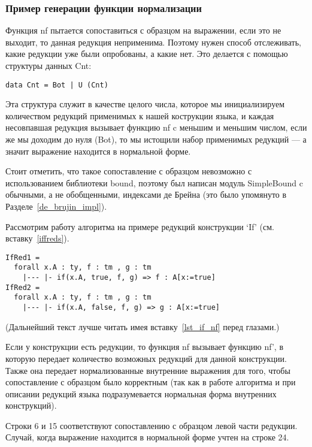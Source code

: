 \pagebreak
\subsubsection{Пример генерации функции нормализации}

Функция nf пытается сопоставиться с образцом на выражении, если это не выходит, то данная редукция неприменима. Поэтому нужен способ отслеживать, какие редукции уже были опробованы, а какие нет. Это делается с помощью структуры данных Cnt:

\begin{lstlisting}
data Cnt = Bot | U (Cnt)
\end{lstlisting}

Эта структура служит в качестве целого числа, которое мы инициализируем количеством редукций применимых к нашей кострукции языка, и каждая несовпавшая редукция вызывает функцию nf c меньшим и меньшим числом, если же мы доходим до нуля (Bot), то мы истощили набор применимых редукций --- а значит выражение находится в нормальной форме.

Стоит отметить, что такое сопоставление с образцом невозможно с использованием библиотеки bound\cite{bound}, поэтому был написан модуль SimpleBound c обычными, а не обобщенными, индексами де Брейна (это было упомянуто в Разделе~\ref{de_brujin_impl}).

Рассмотрим работу алгоритма на примере редукций конструкции `If' (см. вставку~\ref{iffreds}).

\begin{lstlisting}[label={iffreds}, caption={Правила редукций для конструкции If},captionpos=b, frame=single, float, floatplacement=H]
IfRed1 =
  forall x.A : ty, f : tm , g : tm
    |--- |- if(x.A, true, f, g) => f : A[x:=true]
IfRed2 =
  forall x.A : ty, f : tm , g : tm
    |--- |- if(x.A, false, f, g) => g : A[x:=true]
\end{lstlisting}

(Дальнейший текст лучше читать имея вставку~\ref{lst_if_nf} перед глазами.)

Если у конструкции есть редукции, то функция nf вызывает функцию nf', в которую передает количество возможных редукций для данной конструкции. Также она передает нормализованные внутренние выражения для того, чтобы сопоставление с образцом было корректным (так как в работе алгоритма и при описании редукций языка подразумевается нормальная форма внутренних конструкций).

Строки 6 и 15 соответствуют сопоставлению с образцом левой части редукции. Случай, когда выражение находится в нормальной форме учтен на строке 24.


